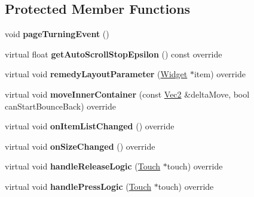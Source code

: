 \subsection*{Protected Member Functions}
\begin{DoxyCompactItemize}
\item 
\mbox{\label{classui_1_1PageView_ac394e95ac9ba2a999d2c4bcfbf10beaf}} 
void {\bfseries page\+Turning\+Event} ()
\item 
\mbox{\label{classui_1_1PageView_ad29d9736eecfd0d5361932e0a7b116a3}} 
virtual float {\bfseries get\+Auto\+Scroll\+Stop\+Epsilon} () const override
\item 
\mbox{\label{classui_1_1PageView_a59f04e4b16c569ac90337ee5dda98690}} 
virtual void {\bfseries remedy\+Layout\+Parameter} (\hyperlink{classui_1_1Widget}{Widget} $\ast$item) override
\item 
\mbox{\label{classui_1_1PageView_ae9b1031a268f943306029398a5f57cf5}} 
virtual void {\bfseries move\+Inner\+Container} (const \hyperlink{classVec2}{Vec2} \&delta\+Move, bool can\+Start\+Bounce\+Back) override
\item 
\mbox{\label{classui_1_1PageView_afa33f868c5b6e21a4102c3b6e1120354}} 
virtual void {\bfseries on\+Item\+List\+Changed} () override
\item 
\mbox{\label{classui_1_1PageView_a671dadcb8f39af5a16137db4ac6af477}} 
virtual void {\bfseries on\+Size\+Changed} () override
\item 
\mbox{\label{classui_1_1PageView_acd473a47d779610b4832b6dcecf04221}} 
virtual void {\bfseries handle\+Release\+Logic} (\hyperlink{classTouch}{Touch} $\ast$touch) override
\item 
\mbox{\label{classui_1_1PageView_a9baf8187686699a1465c8a4a4eb842cd}} 
virtual void {\bfseries handle\+Press\+Logic} (\hyperlink{classTouch}{Touch} $\ast$touch) override
\item 
\mbox{\label{classui_1_1PageView_a8bae7ab955a6d8475cdf74900468cb62}} 

\end{DoxyCompactItemize}
